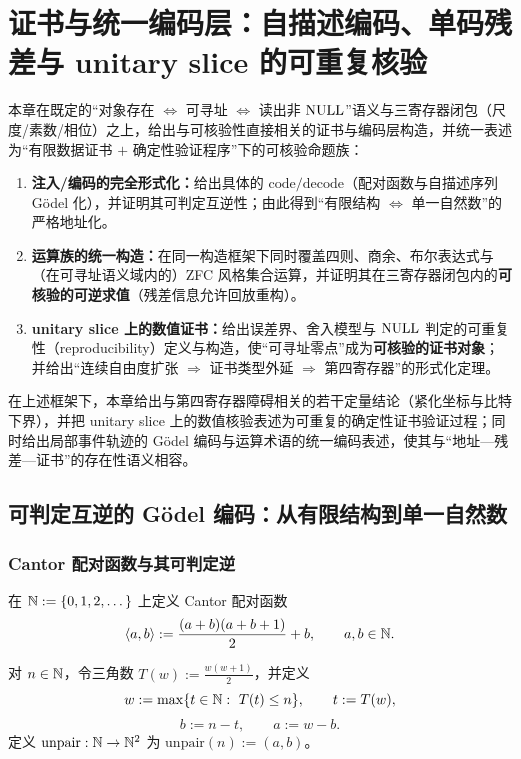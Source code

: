 \section{证书与统一编码层：自描述编码、单码残差与 unitary slice 的可重复核验}\label{sec:conclusion-cluster}

本章在既定的“对象存在 $\Leftrightarrow$ 可寻址 $\Leftrightarrow$ 读出非 $\mathrm{NULL}$”语义与三寄存器闭包（尺度/素数/相位）之上，给出与可核验性直接相关的证书与编码层构造，并统一表述为“有限数据证书 $+$ 确定性验证程序”下的可核验命题族：
\begin{enumerate}
  \item \textbf{注入/编码的完全形式化：}给出具体的 $\mathrm{code}/\mathrm{decode}$（配对函数与自描述序列 Gödel 化），并证明其可判定互逆性；由此得到“有限结构 $\Leftrightarrow$ 单一自然数”的严格地址化。
  \item \textbf{运算族的统一构造：}在同一构造框架下同时覆盖四则、商余、布尔表达式与（在可寻址语义域内的）ZFC 风格集合运算，并证明其在三寄存器闭包内的\textbf{可核验的可逆求值}（残差信息允许回放重构）。
  \item \textbf{unitary slice 上的数值证书：}给出误差界、舍入模型与 $\mathrm{NULL}$ 判定的可重复性（reproducibility）定义与构造，使“可寻址零点”成为\textbf{可核验的证书对象}；并给出“连续自由度扩张 $\Rightarrow$ 证书类型外延 $\Rightarrow$ 第四寄存器”的形式化定理。
\end{enumerate}

在上述框架下，本章给出与第四寄存器障碍相关的若干定量结论（紧化坐标与比特下界），并把 unitary slice 上的数值核验表述为可重复的确定性证书验证过程；同时给出局部事件轨迹的 Gödel 编码与运算术语的统一编码表述，使其与“地址—残差—证书”的存在性语义相容。

\subsection{可判定互逆的 Gödel 编码：从有限结构到单一自然数}\label{subsec:cc-godel}

\subsubsection{Cantor 配对函数与其可判定逆}
\begin{definition}\label{def:cc-cantor-pair}
在 $\mathbb{N}:=\{0,1,2,\dots\}$ 上定义 Cantor 配对函数
$$
\langle a,b\rangle := \frac{(a+b)(a+b+1)}{2}+b,\qquad a,b\in\mathbb{N}.
$$
\end{definition}

\begin{definition}\label{def:cc-cantor-unpair}
对 $n\in\mathbb{N}$，令三角数 $T(w):=\frac{w(w+1)}{2}$，并定义
$$
w:=\max\{t\in\mathbb{N}:\ T(t)\le n\},\qquad t:=T(w),
$$
$$
b:=n-t,\qquad a:=w-b.
$$
定义 $\mathrm{unpair}:\mathbb{N}\to\mathbb{N}^2$ 为 $\mathrm{unpair}(n):=(a,b)$。
\end{definition}


